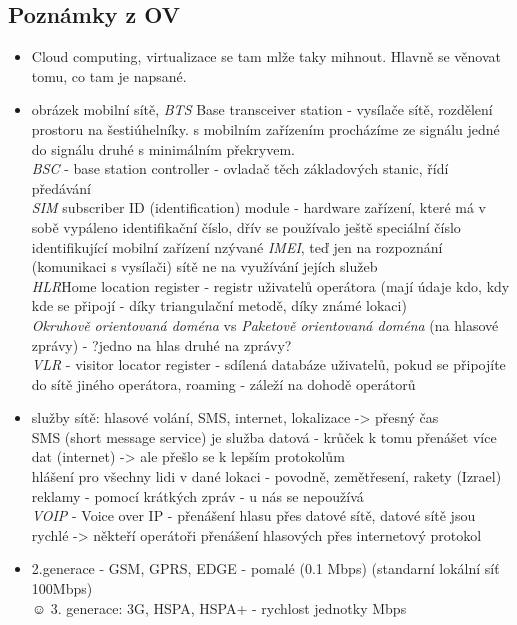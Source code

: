 \documentclass[12pt]{article}
\begin{document}
\subsection{Poznámky z OV}
\begin{itemize}
\item Cloud computing, virtualizace se tam mlže taky mihnout. Hlavně se věnovat tomu, co tam je napsané.
\item obrázek mobilní sítě, \emph{BTS} Base transceiver station - vysílače sítě, rozdělení prostoru na šestiúhelníky. s mobilním zařízením procházíme ze signálu jedné do signálu druhé s minimálním překryvem.\\
\emph{BSC} - base station controller - ovladač těch základových stanic, řídí předávání\\
\emph{SIM} subscriber ID (identification) module - hardware zařízení, které má v sobě vypáleno identifikační číslo, dřív se používalo ještě speciální číslo identifikující mobilní zařízení nzývané \emph{IMEI}, teď jen na rozpoznání (komunikaci s vysílači) sítě ne na využívání jejích služeb\\
\emph{HLR}Home location register - registr uživatelů operátora (mají údaje kdo, kdy kde se připojí - díky triangulační metodě, díky známé lokaci)\\
\emph{Okruhově orientovaná doména} vs \emph{Paketově orientovaná doména} (na hlasové zprávy) - ?jedno na hlas druhé na zprávy?\\
\emph{VLR} - visitor locator register - sdílená databáze uživatelů, pokud se připojíte do sítě jiného operátora, roaming - záleží na dohodě operátorů
\item služby sítě: hlasové volání, SMS, internet, lokalizace -> přesný čas\\
SMS (short message service) je služba datová - krůček k tomu přenášet více dat (internet) -> ale přešlo se k lepším protokolům\\
hlášení pro všechny lidi v dané lokaci - povodně, zemětřesení, rakety (Izrael)\\
reklamy - pomocí krátkých zpráv - u nás se nepoužívá\\
\emph{VOIP} - Voice over IP - přenášení hlasu přes datové sítě, datové sítě jsou rychlé -> někteří operátoři přenášení hlasových přes internetový protokol\\
\item 2.generace - GSM, GPRS, EDGE - pomalé (0.1 Mbps) (standarní lokální síť 100Mbps)\\☺
3. generace: 3G, HSPA, HSPA+ - rychlost jednotky Mbps\\

\end{itemize}
\end{document}
